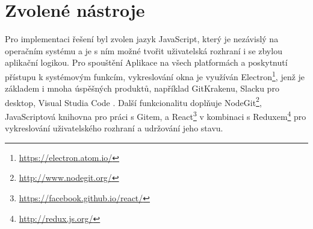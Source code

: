 \section{Zvolené nástroje}

Pro implementaci řešení byl zvolen jazyk JavaScript, který je nezávislý na operačním systému a je s ním možné tvořit uživatelská rozhraní i se zbylou aplikační logikou. Pro spouštění Aplikace na všech platformách a poskytnutí přístupu k systémovým funkcím, vykreslování okna je využíván Electron\footnote{\url{https://electron.atom.io/}}, jenž je základem i mnoha úspěšných produktů, například GitKrakenu, Slacku pro desktop, Visual Studia Code \cite{electron-representative}. Další funkcionalitu doplňuje NodeGit\footnote{\url{http://www.nodegit.org/}}, JavaScriptová knihovna pro práci s Gitem, a React\footnote{\url{https://facebook.github.io/react/}} v kombinaci s Reduxem\footnote{\url{http://redux.js.org/}} pro vykreslování uživatelského rozhraní a udržování jeho stavu.